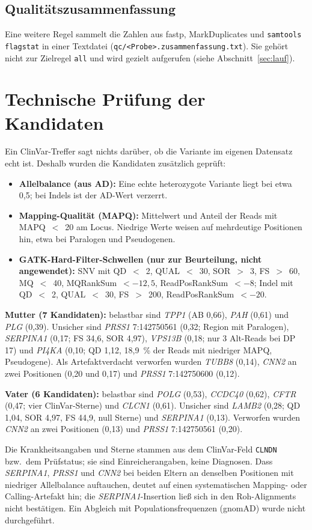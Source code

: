 \documentclass[10pt,a4paper,twocolumn]{article}
\newcommand{\gene}[1]{\textit{#1}}
\begin{document}
\subsection{Qualitätszusammenfassung}
Eine weitere Regel sammelt die Zahlen aus fastp, MarkDuplicates und \texttt{samtools flagstat} in einer Textdatei (\texttt{qc/<Probe>.zusammenfassung.txt}). Sie gehört nicht zur Zielregel \texttt{all} und wird gezielt aufgerufen (siehe Abschnitt~\ref{sec:lauf}).
 
\section{Technische Prüfung der Kandidaten}
Ein ClinVar-Treffer sagt nichts darüber, ob die Variante im eigenen Datensatz echt ist. Deshalb wurden die Kandidaten zusätzlich geprüft:
\begin{itemize}
\item \textbf{Allelbalance (aus AD):} Eine echte heterozygote Variante liegt bei etwa 0,5; bei Indels ist der AD-Wert verzerrt.
\item \textbf{Mapping-Qualität (MAPQ):} Mittelwert und Anteil der Reads mit MAPQ~$<$~20 am Locus. Niedrige Werte weisen auf mehrdeutige Positionen hin, etwa bei Paralogen und Pseudogenen.
\item \textbf{GATK-Hard-Filter-Schwellen (nur zur Beurteilung, nicht angewendet):} SNV mit QD~$<$~2, QUAL~$<$~30, SOR~$>$~3, FS~$>$~60, MQ~$<$~40, MQRankSum~$<-12{,}5$, ReadPosRankSum~$<-8$; Indel mit QD~$<$~2, QUAL~$<$~30, FS~$>$~200, ReadPosRankSum~$<-20$.
\end{itemize}
\textbf{Mutter (7 Kandidaten):} belastbar sind \gene{TPP1} (AB 0,66), \gene{PAH} (0,61) und \gene{PLG} (0,39). Unsicher sind \gene{PRSS1} 7:142750561 (0,32; Region mit Paralogen), \gene{SERPINA1} (0,17; FS 34,6, SOR 4,97), \gene{VPS13B} (0,18; nur 3 Alt-Reads bei DP 17) und \gene{PI4KA} (0,10; QD 1,12, 18,9~\% der Reads mit niedriger MAPQ, Pseudogene). Als Artefaktverdacht verworfen wurden \gene{TUBB8} (0,14), \gene{CNN2} an zwei Positionen (0,20 und 0,17) und \gene{PRSS1} 7:142750600 (0,12).
 
\textbf{Vater (6 Kandidaten):} belastbar sind \gene{POLG} (0,53), \gene{CCDC40} (0,62), \gene{CFTR} (0,47; vier ClinVar-Sterne) und \gene{CLCN1} (0,61). Unsicher sind \gene{LAMB2} (0,28; QD 1,04, SOR 4,97, FS 44,9, null Sterne) und \gene{SERPINA1} (0,13). Verworfen wurden \gene{CNN2} an zwei Positionen (0,13) und \gene{PRSS1} 7:142750561 (0,20).
 
Die Krankheitsangaben und Sterne stammen aus dem ClinVar-Feld \texttt{CLNDN} bzw.\ dem Prüfstatus; sie sind Einreicherangaben, keine Diagnosen. Dass \gene{SERPINA1}, \gene{PRSS1} und \gene{CNN2} bei beiden Eltern an denselben Positionen mit niedriger Allelbalance auftauchen, deutet auf einen systematischen Mapping- oder Calling-Artefakt hin; die \gene{SERPINA1}-Insertion ließ sich in den Roh-Alignments nicht bestätigen. Ein Abgleich mit Populationsfrequenzen (gnomAD) wurde nicht durchgeführt.
 
\end{document}
